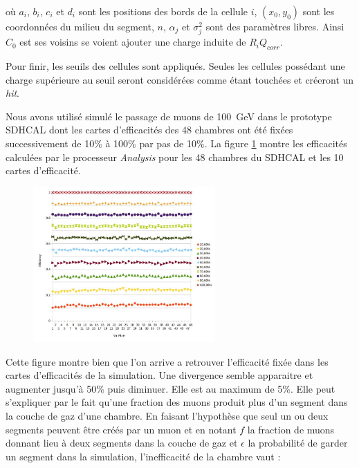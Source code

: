 où $a_i$, $b_i$, $c_i$ et $d_i$ sont les positions des bords de la cellule $i$, $(x_0,y_0)$ sont les coordonnées du milieu du segment, $n$, $\alpha_j$ et $\sigma_j^2$ sont des paramètres libres. Ainsi $C_0$ est ses voisins se voient ajouter une charge induite de $R_iQ_{corr}$.

Pour finir, les seuils des cellules sont appliqués. Seules les cellules possédant une charge supérieure au seuil seront considérées comme étant touchées et créeront un \textit{hit}.

Nous avons utilisé simulé le passage de muons de \SI{100}{\giga\eV} dans le prototype SDHCAL dont les cartes d'efficacités des \num{48} chambres ont été fixées successivement de \num{10}\% à \num{100}\% par pas de \num{10}\%. La figure \ref{effisimul} montre les efficacités calculées par le processeur \textit{Analysis} pour les \num{48} chambres du SDHCAL et les \num{10} cartes d'efficacité.

\begin{figure}[ht!]
	\centering
	\includegraphics[width=0.62\textwidth]{GLA/effisimul.jpg}
	\label{effisimul}
\end{figure}

Cette figure montre bien que l'on arrive a retrouver l'efficacité fixée dans les cartes d'efficacités de la simulation. Une divergence semble apparaitre et augmenter jusqu'à \num{50}\% puis diminuer. Elle est au maximum de \num{5}\%. Elle peut s'expliquer par le fait qu'une fraction des muons produit plus d'un segment dans la couche de gaz d'une chambre. En faisant l'hypothèse que seul un ou deux segments peuvent être créés par un muon et en notant $f$ la fraction de muons donnant lieu à deux segments dans la couche de gaz et $\epsilon$ la probabilité de garder un segment dans la simulation, l'inefficacité de la chambre vaut :

